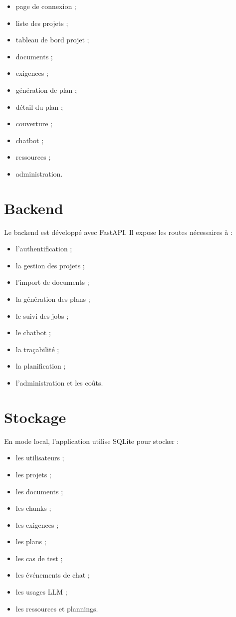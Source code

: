 \documentclass[
  french,
]{report}
\providecommand{\tightlist}{%
  \setlength{\itemsep}{0pt}\setlength{\parskip}{0pt}}
\begin{document}
\begin{itemize}
\tightlist
\item
  page de connexion ;
\item
  liste des projets ;
\item
  tableau de bord projet ;
\item
  documents ;
\item
  exigences ;
\item
  génération de plan ;
\item
  détail du plan ;
\item
  couverture ;
\item
  chatbot ;
\item
  ressources ;
\item
  administration.
\end{itemize}

\section{Backend}\label{backend}

Le backend est développé avec FastAPI. Il expose les routes nécessaires
à :

\begin{itemize}
\tightlist
\item
  l'authentification ;
\item
  la gestion des projets ;
\item
  l'import de documents ;
\item
  la génération des plans ;
\item
  le suivi des jobs ;
\item
  le chatbot ;
\item
  la traçabilité ;
\item
  la planification ;
\item
  l'administration et les coûts.
\end{itemize}

\section{Stockage}\label{stockage}

En mode local, l'application utilise SQLite pour stocker :

\begin{itemize}
\tightlist
\item
  les utilisateurs ;
\item
  les projets ;
\item
  les documents ;
\item
  les chunks ;
\item
  les exigences ;
\item
  les plans ;
\item
  les cas de test ;
\item
  les événements de chat ;
\item
  les usages LLM ;
\item
  les ressources et plannings.
\end{itemize}
\end{document}
